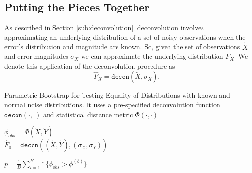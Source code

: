 \documentclass[12pt]{article}
\begin{document}


\subsection{Putting the Pieces Together} %
\label{sub:putting_the_pieces_together}

As described in Section \ref{sub:deconvolution}, deconvolution involves approximating an underlying distribution of a set of noisy observations when the error's distribution and magnitude are known. So, given the set of observations $\widetilde{X}$ and error magnitudes $\sigma_X$ we can approximate the underlying distribution $F_X$. We denote this application of the deconvolution procedure as
\begin{equation}
\widehat{F}_X = \texttt{decon}(\widetilde{X}, \sigma_X).
\end{equation}



\begin{algorithm}[H]
\caption{Parametric Bootstrap for Testing Equality of Distributions with known and normal noise distributions. It uses a pre-specified deconvolution function $\texttt{decon}(\cdot, \cdot)$ and statistical distance metric $\Phi(\cdot, \cdot)$}
\label{deconv_boot_test}


 $\phi_{obs} = \Phi(\widetilde{X}, \widetilde{Y})$\\
 $\widehat{F}_0 = \texttt{decon}((\widetilde{X}, \widetilde{Y}), (\sigma_X, \sigma_Y))$

 $p = \frac{1}{B}\sum_{i = 1}^B {{\mathds{1}}\{\phi_{obs} > \phi^{(b)}\}}$

\end{algorithm}
\end{document}
